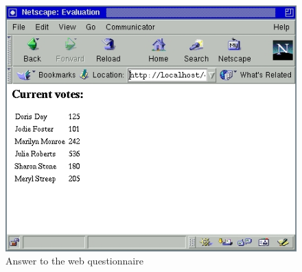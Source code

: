 \begin{figure}[t]
\begin{center}
\includegraphics[scale=0.8]{PICTURES/quest_answer.jpg}
\end{center}\vspace{-3ex}
\caption{Answer to the web questionnaire\label{fig-quest-answer}}
\end{figure}

